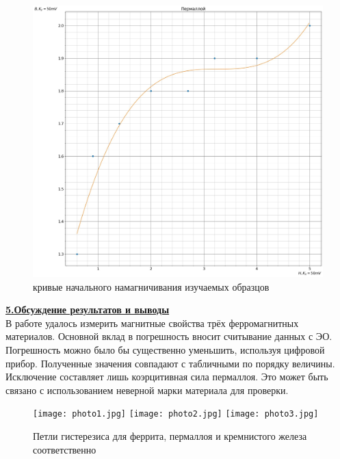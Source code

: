 \documentclass[12pt, letterpaper, oneside]{article}
\begin{document}
\begin{figure}[H]
\begin{center}
\includegraphics[scale = 0.15]{3.jpg}
\end{center}
\caption{кривые начального намагничивания изучаемых образцов}
\end{figure}
\noindent\textbf{\underline{5.Обсуждение результатов и выводы}}\\
В работе удалось измерить магнитные свойства трёх ферромагнитных материалов. Основной вклад в погрешность вносит считывание данных с ЭО. Погрешность можно было бы существенно уменьшить, используя цифровой прибор. Полученные значения совпадают с табличными по порядку величины. Исключение составляет лишь коэрцитивная сила пермаллоя. Это может быть связано с использованием неверной марки материала для проверки.
\begin{figure}[h]
\texttt{[image: photo1.jpg]}
\texttt{[image: photo2.jpg]}
\texttt{[image: photo3.jpg]}
\caption{Петли гистерезиса для феррита, пермаллоя и кремнистого железа соответственно}
\end{figure}
\end{document}
